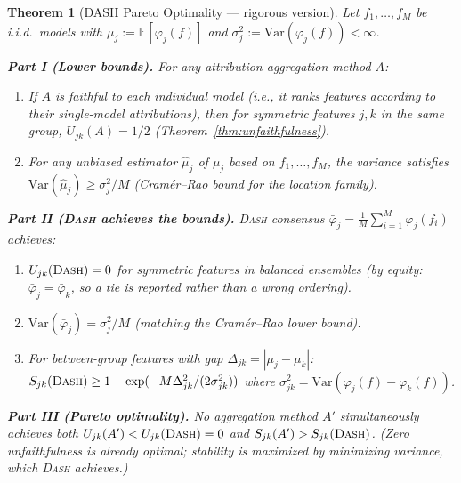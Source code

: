 \documentclass{article}
\newcommand{\Var}{\mathrm{Var}}
\newcommand{\DASH}{\textsc{Dash}}
\newtheorem{theorem}{Theorem}
\begin{document}
\begin{theorem}[DASH Pareto Optimality --- rigorous version]
\label{thm:dash-optimal}
Let $f_1, \ldots, f_M$ be i.i.d.\ models with
$\mu_j := \mathbb{E}[\varphi_j(f)]$ and
$\sigma_j^2 := \Var(\varphi_j(f)) < \infty$.

\textbf{Part I (Lower bounds).}
For any attribution aggregation method $A$:
\begin{enumerate}
    \item[(a)] If $A$ is faithful to each individual model (i.e., it
      ranks features according to their single-model attributions),
      then for symmetric features $j, k$ in the same group,
      $U_{jk}(A) = 1/2$ (Theorem~\ref{thm:unfaithfulness}).
    \item[(b)] For any unbiased estimator $\hat\mu_j$ of $\mu_j$
      based on $f_1, \ldots, f_M$, the variance satisfies
      $\Var(\hat\mu_j) \geq \sigma_j^2 / M$
      (Cram\'er--Rao bound for the location family).
\end{enumerate}

\textbf{Part II (\DASH{} achieves the bounds).}
\DASH{} consensus $\bar\varphi_j = \frac{1}{M}\sum_{i=1}^M \varphi_j(f_i)$
achieves:
\begin{enumerate}
    \item[(c)] $U_{jk}(\text{\DASH{}}) = 0$ for symmetric features in
      balanced ensembles (by equity: $\bar\varphi_j = \bar\varphi_k$,
      so a tie is reported rather than a wrong ordering).
    \item[(d)] $\Var(\bar\varphi_j) = \sigma_j^2 / M$ (matching the
      Cram\'er--Rao lower bound).
    \item[(e)] For between-group features with gap
      $\Delta_{jk} = |\mu_j - \mu_k|$:
      $S_{jk}(\text{\DASH{}}) \geq 1 - \exp(-M\Delta_{jk}^2 / (2\sigma_{jk}^2))$
      where $\sigma_{jk}^2 = \Var(\varphi_j(f) - \varphi_k(f))$.
\end{enumerate}

\textbf{Part III (Pareto optimality).}
No aggregation method $A'$ simultaneously achieves both
$U_{jk}(A') < U_{jk}(\text{\DASH{}}) = 0$ and
$S_{jk}(A') > S_{jk}(\text{\DASH{}})$.
(Zero unfaithfulness is already optimal; stability is maximized by
minimizing variance, which \DASH{} achieves.)
\end{theorem}
\end{document}
